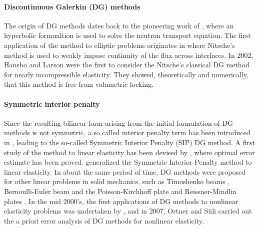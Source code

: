 \paragraph{Discontinuous Galerkin (DG) methods}

The origin of DG methods dates back to the pioneering work of
\cite{reed_triangular_1973}, where an hyperbolic formualtion is used to
solve the neutron transport equation. The first application of the
method to elliptic problems originates in \cite{babuska_finite_1973}
where Nitsche's method \cite{nitsche_uber_1970} is used to weakly impose
continuity of the flux across interfaces.
In 2002, Hansbo and Larson \cite{hansbo_discontinuous_2002-1} were the first to
consider the Nitsche's classical DG method for nearly incompressible
elasticity. They showed, theoretically and numerically, that this
method is free from volumetric locking.


%
%

\paragraph{Symmetric interior penalty}

Since the resulting bilinear form
arising from the initial formulation of DG methods is not symmetric, a so called interior
penalty term has been introduced in \cite{wheeler_elliptic_1978},
leading to the so-called Symmetric Interior Penalty (SIP) DG method. A first study
of the method to linear elasticity has been devised by
\cite{riviere_optimal_2000}, where optimal error estimate has been
proved.
%
%
%
\cite{lew_optimal_2004} generalized the
Symmetric Interior Penalty method to linear elasticity.
In about the same
period of time, DG methods were proposed for other linear problems in
solid mechanics, such as Timoshenko beams
\cite{celiker_locking-free_2006}, Bernoulli-Euler beam and the
Poisson-Kirchhoff plate \cite{brenner_balancing_1999,
  engel_continuousdiscontinuous_2002} and Reissner-Mindlin plates
\cite{arnold_family_2005}. In the mid 2000's, the first applications
of DG methods to nonlinear elasticity problems was undertaken by
\cite{ten_eyck_discontinuous_2006, noels_general_2006}, and in 2007,
Ortner and Süli \cite{ortner_discontinuous_2007} carried out the a
priori error analysis of DG methods for nonlinear elasticity.

